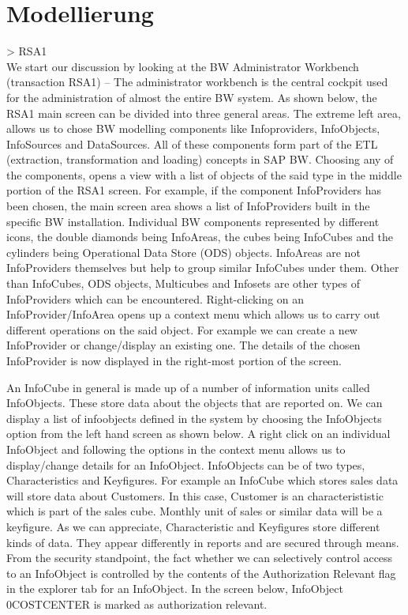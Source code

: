 \chapter{Modellierung}
> RSA1\\



We start our discussion by looking at the BW Administrator Workbench (transaction RSA1) – The administrator workbench is the central cockpit used for the administration of almost the entire BW system. As shown below, the RSA1 main screen can be divided into three general areas. The extreme left area, allows us to chose BW modelling components like Infoproviders, InfoObjects, InfoSources and DataSources. All of these components form part of the ETL (extraction, transformation and loading) concepts in SAP BW. Choosing any of the components, opens a view with a list of objects of the said type in the middle portion of the RSA1 screen. For example, if the component InfoProviders has been chosen, the main screen area shows a list of InfoProviders built in the specific BW installation. Individual BW components represented by different icons, the double diamonds being InfoAreas, the cubes being InfoCubes and the cylinders being Operational Data Store (ODS) objects. InfoAreas are not InfoProviders themselves but help to group similar InfoCubes under them. Other than InfoCubes, ODS objects, Multicubes and Infosets are other types of InfoProviders which can be encountered.
Right-clicking on an InfoProvider/InfoArea opens up a context menu which allows us to carry out different operations on the said object. For example we can create a new InfoProvider or change/display an existing one. The details of the chosen InfoProvider is now displayed in the right-most portion of the screen.

An InfoCube in general is made up of a number of information units called InfoObjects. These store data about the objects that are reported on. We can display a list of infoobjects defined in the system by choosing the InfoObjects option from the left hand screen as shown below. A right click on an individual InfoObject and following the options in the context menu allows us to display/change details for an InfoObject. InfoObjects can be of two types, Characteristics and Keyfigures. For example an InfoCube which stores sales data will store data about Customers. In this case, Customer is an characterististic which is part of the sales cube. Monthly unit of sales or similar data will be a keyfigure. As we can appreciate, Characteristic and Keyfigures store different kinds of data. They appear differently in reports and are secured through means. From the security standpoint, the fact whether we can selectively control access to an InfoObject is controlled by the contents of the Authorization Relevant flag in the explorer tab for an InfoObject. In the screen below, InfoObject 0COSTCENTER is marked as authorization relevant.


